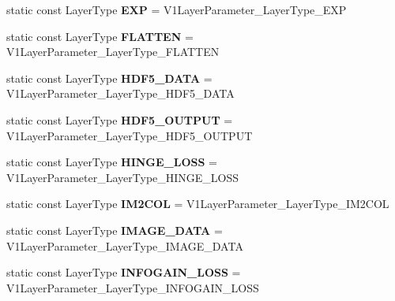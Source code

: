 \begin{DoxyCompactItemize}
static const Layer\+Type {\bfseries E\+XP} = V1\+Layer\+Parameter\+\_\+\+Layer\+Type\+\_\+\+E\+XP
\item 
\mbox{\label{classcaffe_1_1_v1_layer_parameter_aee7271d033b223f222997103b09d3912}} 
static const Layer\+Type {\bfseries F\+L\+A\+T\+T\+EN} = V1\+Layer\+Parameter\+\_\+\+Layer\+Type\+\_\+\+F\+L\+A\+T\+T\+EN
\item 
\mbox{\label{classcaffe_1_1_v1_layer_parameter_a8690de3c2c7b94ed8edb821f429e873b}} 
static const Layer\+Type {\bfseries H\+D\+F5\+\_\+\+D\+A\+TA} = V1\+Layer\+Parameter\+\_\+\+Layer\+Type\+\_\+\+H\+D\+F5\+\_\+\+D\+A\+TA
\item 
\mbox{\label{classcaffe_1_1_v1_layer_parameter_a60fdef413b04c6b6f89ce688a5062660}} 
static const Layer\+Type {\bfseries H\+D\+F5\+\_\+\+O\+U\+T\+P\+UT} = V1\+Layer\+Parameter\+\_\+\+Layer\+Type\+\_\+\+H\+D\+F5\+\_\+\+O\+U\+T\+P\+UT
\item 
\mbox{\label{classcaffe_1_1_v1_layer_parameter_a1a9134c270be19ec49cb9e0b206ddfcc}} 
static const Layer\+Type {\bfseries H\+I\+N\+G\+E\+\_\+\+L\+O\+SS} = V1\+Layer\+Parameter\+\_\+\+Layer\+Type\+\_\+\+H\+I\+N\+G\+E\+\_\+\+L\+O\+SS
\item 
\mbox{\label{classcaffe_1_1_v1_layer_parameter_af8123cbfb4c4f942ff97bee8c98b42f4}} 
static const Layer\+Type {\bfseries I\+M2\+C\+OL} = V1\+Layer\+Parameter\+\_\+\+Layer\+Type\+\_\+\+I\+M2\+C\+OL
\item 
\mbox{\label{classcaffe_1_1_v1_layer_parameter_a4a66c2b33725f79b3d1076e1b01f1153}} 
static const Layer\+Type {\bfseries I\+M\+A\+G\+E\+\_\+\+D\+A\+TA} = V1\+Layer\+Parameter\+\_\+\+Layer\+Type\+\_\+\+I\+M\+A\+G\+E\+\_\+\+D\+A\+TA
\item 
\mbox{\label{classcaffe_1_1_v1_layer_parameter_af20b33093f643840478a3f5af6b5178f}} 
static const Layer\+Type {\bfseries I\+N\+F\+O\+G\+A\+I\+N\+\_\+\+L\+O\+SS} = V1\+Layer\+Parameter\+\_\+\+Layer\+Type\+\_\+\+I\+N\+F\+O\+G\+A\+I\+N\+\_\+\+L\+O\+SS
\item 

\end{DoxyCompactItemize}
